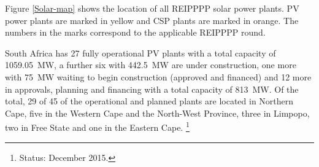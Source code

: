 
Figure \ref{Solar-map} shows the location of all \ac{REIPPPP} solar power plants. \ac{PV} power plants are marked in yellow and \ac{CSP} plants are marked in orange. The numbers in the marks correspond to the applicable \ac{REIPPPP} round.


%

South Africa has 27 fully operational PV plants with a total capacity of \SI{1059.05}{\mega\watt}, a further six with \SI{442.5}{\mega\watt} are under construction, one more with \SI{75}{\mega\watt} waiting to begin construction (approved and financed) and 12 more in approvals, planning and financing with a total capacity of \SI{813}{\mega\watt}. Of the total, 29 of 45 of the operational and planned plants are located in Northern Cape, five in the Western Cape and the North-West Province, three in Limpopo, two in Free State and one in the Eastern Cape. \cite{Forder2015}\footnote{Status: December 2015.}


\pagebreak

